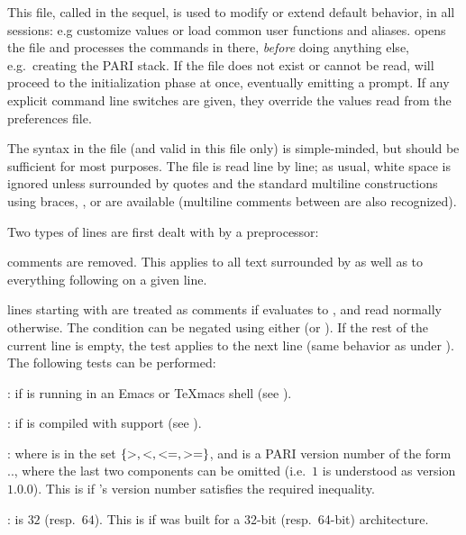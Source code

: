 This file, called  in the sequel, is used to modify or extend
 default behavior, in all  sessions: e.g customize
 values or load common user functions and aliases. 
opens the  file and processes the commands in there, \emph{before}
doing anything else, e.g.~creating the PARI stack. If the file does not exist
or cannot be read,  will proceed to the initialization phase at once,
eventually emitting a prompt. If any explicit command line switches are
given, they override the values read from the preferences file.

 The syntax in the  file (and valid in this file
only) is simple-minded, but should be sufficient for most purposes. The file
is read line by line; as usual, white space is ignored unless surrounded by
quotes and the standard multiline constructions using braces, \kbd{\bs}, or
\kbd{=} are available (multiline comments between \kbd{/*~\dots~*/} are also
recognized).

Two types of lines are first dealt with by a preprocessor:

\item comments are removed. This applies to all text surrounded by
\kbd{/*~\dots~*/} as well as to everything following \kbd{\bs\bs} on a given
line.

\item lines starting with   are treated as
comments if  evaluates to , and read normally
otherwise. The condition can be negated using either  (or
). If the rest of the current line is empty, the test applies to
the next line (same behavior as \kbd{=} under ). The following
tests can be performed:

:  if  is running in an Emacs or TeXmacs shell (see
).

:  if  is compiled with  support (see
).

  : where  is in the set
$\{ {\tt >}, {\tt <}, {\tt <=}, {\tt >=} \}$, and  is a PARI
version number of the form .., where the
last two components can be omitted (i.e.~$1$ is understood as version $1.0.0$).
This is  if 's version number satisfies the required
inequality.

 \kbd{==} :  is $32$ (resp.~$64$).
This is  if  was built for a 32-bit (resp.~64-bit)
architecture.


